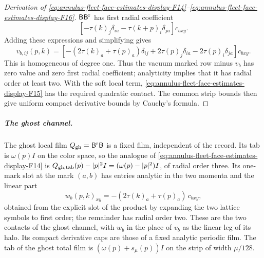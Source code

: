 \begin{proof}[Derivation of \eqref{eq:annulus-fleet-face-estimates-display-F14}--\eqref{eq:annulus-fleet-face-estimates-display-F16}]
$\mathsf B\mathsf B^{\rm r}$ has first radial coefficient
\[
 [-\tau(k)_j\delta_{ia}-\tau(k+p)_i\delta_{ja}]c_{bxy}.
\]
Adding these expressions and simplifying gives
\[
 v_{b,ij}(p,k)=
 [-(2\tau(k)_a+\tau(p)_a)\delta_{ij}
      +2\tau(p)_j\delta_{ia}-2\tau(p)_i\delta_{ja}]c_{bxy}.
\]
This is homogeneous of degree one. Thus the vacuum marked row minus
$v_b$ has zero value and zero first radial coefficient; analyticity
implies that it has radial order at least two. With the soft local term,
\eqref{eq:annulus-fleet-face-estimates-display-F15} has the required quadratic contact. The common strip bounds then
give uniform compact derivative bounds by Cauchy's formula.
\end{proof}

\subparagraph{The ghost channel.}
The ghost local film $Q_{\rm gh}=\mathsf B^{\rm r}\mathsf B$ is a fixed
film, independent of the record. Its tab is $\omega(p)I$ on the color
space, so the analogue of \eqref{eq:annulus-fleet-face-estimates-display-F14} is
$Q_{{\rm gh},{\rm tab}}(p)-|p|^2I=(\omega(p)-|p|^2)I$, of radial order
three. Its one-mark slot at the mark $(a,b)$ has entries analytic in
the two momenta and the linear part
\[
 w_b(p,k)_{xy}=-(2\tau(k)_a+\tau(p)_a)\,c_{bxy},
\]
obtained from the explicit slot of the product by expanding the two
lattice symbols to first order; the remainder has radial order two.
These are the two contacts of the ghost channel, with $w_b$ in the
place of $v_b$ as the linear leg of its halo. Its compact derivative
caps are those of a fixed analytic periodic film. The tab of the ghost
total film is $(\omega(p)+s_\mu(p))I$ on the strip of width $\mu/128$.

